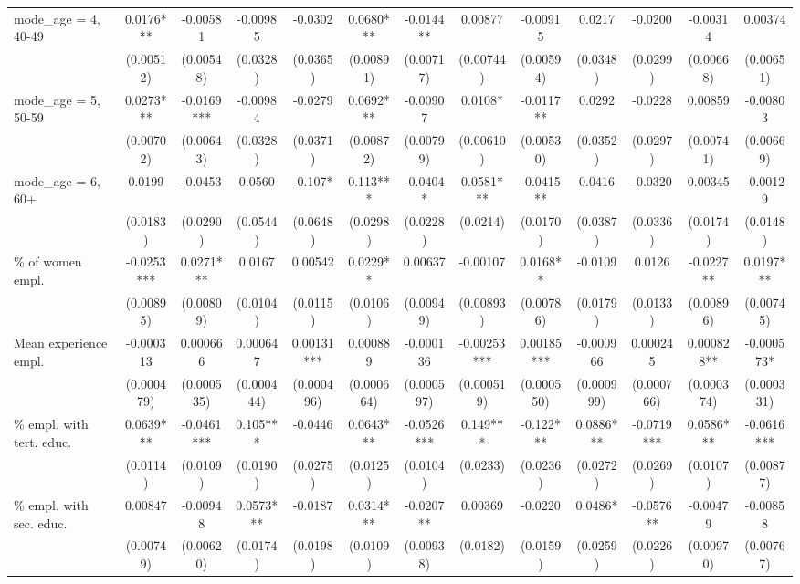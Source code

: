 \documentclass[]{article}
\begin{document}
\begin{tabular}{lcccccccccccc}
mode\_age = 4, 40-49 & 0.0176*** & -0.00581 & -0.00985 & -0.0302 & 0.0680*** & -0.0144** & 0.00877 & -0.00915 & 0.0217 & -0.0200 & -0.00314 & 0.00374 \\
 & (0.00512) & (0.00548) & (0.0328) & (0.0365) & (0.00891) & (0.00717) & (0.00744) & (0.00594) & (0.0348) & (0.0299) & (0.00668) & (0.00651) \\
mode\_age = 5, 50-59 & 0.0273*** & -0.0169*** & -0.00984 & -0.0279 & 0.0692*** & -0.00907 & 0.0108* & -0.0117** & 0.0292 & -0.0228 & 0.00859 & -0.00803 \\
 & (0.00702) & (0.00643) & (0.0328) & (0.0371) & (0.00872) & (0.00799) & (0.00610) & (0.00530) & (0.0352) & (0.0297) & (0.00741) & (0.00669) \\
mode\_age = 6, 60+ & 0.0199 & -0.0453 & 0.0560 & -0.107* & 0.113*** & -0.0404* & 0.0581*** & -0.0415** & 0.0416 & -0.0320 & 0.00345 & -0.00129 \\
 & (0.0183) & (0.0290) & (0.0544) & (0.0648) & (0.0298) & (0.0228) & (0.0214) & (0.0170) & (0.0387) & (0.0336) & (0.0174) & (0.0148) \\
\% of women empl. & -0.0253*** & 0.0271*** & 0.0167 & 0.00542 & 0.0229** & 0.00637 & -0.00107 & 0.0168** & -0.0109 & 0.0126 & -0.0227** & 0.0197*** \\
 & (0.00895) & (0.00809) & (0.0104) & (0.0115) & (0.0106) & (0.00949) & (0.00893) & (0.00786) & (0.0179) & (0.0133) & (0.00896) & (0.00745) \\
Mean experience empl. & -0.000313 & 0.000666 & 0.000647 & 0.00131*** & 0.000889 & -0.000136 & -0.00253*** & 0.00185*** & -0.000966 & 0.000245 & 0.000828** & -0.000573* \\
 & (0.000479) & (0.000535) & (0.000444) & (0.000496) & (0.000664) & (0.000597) & (0.000519) & (0.000550) & (0.000999) & (0.000766) & (0.000374) & (0.000331) \\
\% empl. with tert. educ. & 0.0639*** & -0.0461*** & 0.105*** & -0.0446 & 0.0643*** & -0.0526*** & 0.149*** & -0.122*** & 0.0886*** & -0.0719*** & 0.0586*** & -0.0616*** \\
 & (0.0114) & (0.0109) & (0.0190) & (0.0275) & (0.0125) & (0.0104) & (0.0233) & (0.0236) & (0.0272) & (0.0269) & (0.0107) & (0.00877) \\
\% empl. with sec. educ. & 0.00847 & -0.00948 & 0.0573*** & -0.0187 & 0.0314*** & -0.0207** & 0.00369 & -0.0220 & 0.0486* & -0.0576** & -0.00479 & -0.00858 \\
 & (0.00749) & (0.00620) & (0.0174) & (0.0198) & (0.0109) & (0.00938) & (0.0182) & (0.0159) & (0.0259) & (0.0226) & (0.00970) & (0.00767) \\

\end{tabular}
\end{document}
